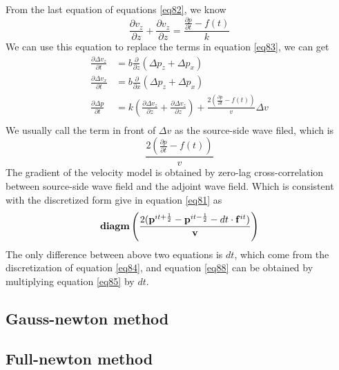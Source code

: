 \documentclass[revised,endfloat]{geophysics}
\begin{document}
From the last equation of equations \ref{eq82}, we know
\begin{equation}
\frac{\partial v_z}{\partial z} +  \frac{\partial v_z}{\partial z}  = \frac{\frac{\partial p}{\partial t} - f(t)}{k}
\label{eq85}
\end{equation}
We can use this equation to replace the terms in equation \ref{eq83}, we can get
\begin{equation}
\begin{split}
\frac{\partial \Delta v_z}{\partial t} &= b \frac{\partial }{\partial z} \left(\Delta p_z  + \Delta p_x \right) \\
\frac{\partial \Delta v_x}{\partial t} &=  b \frac{\partial }{\partial x} \left(\Delta p_z  + \Delta p_x \right) \\
\frac{\partial  \Delta p}{\partial t} &= k \left( \frac{\partial  \Delta v_z}{\partial z} +  \frac{\partial  \Delta v_z}{\partial z} \right) + \frac{2\left( \frac{\partial p}{\partial t} - f(t)\right)}{v} \Delta v  \\
\end{split}
\label{eq86}
\end{equation}
We usually call the term in front of $\Delta v$ as the source-side wave filed, which is 
\begin{equation}
\frac{2\left( \frac{\partial p}{\partial t} - f(t)\right)}{v}
\label{eq87}
\end{equation}
The gradient of the velocity model is obtained by zero-lag cross-correlation between source-side wave field and the adjoint wave field.
Which is consistent with the discretized form give in equation \ref{eq81} as
\begin{equation}	
{\bf diagm} \left( \frac{2({\bf p}^{it+\frac{1}{2}} - {\bf p}^{it-\frac{1}{2}}  - dt \cdot {\bf f}^{it})}{{\bf v}} \right) 
\label{eq88}
\end{equation}
The only difference between above two equations is $dt$, which come from the discretization of equation \ref{eq84}, and equation \ref{eq88} can be obtained by multiplying equation \ref{eq85} by $dt$. 

\subsection{Gauss-newton method}

\subsection{Full-newton method}
\end{document}

